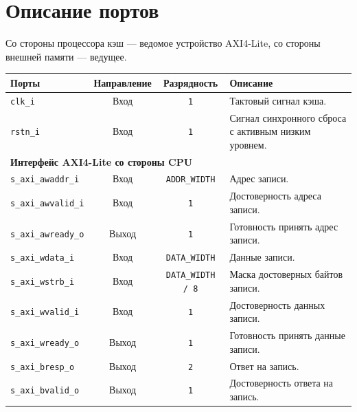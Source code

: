 \section{Описание портов}

Со стороны процессора кэш --- ведомое устройство AXI4-Lite, со стороны внешней памяти --- ведущее.

\begin{table}[H]
	\centering
	\label{tab:cache_ports}
	\small
	\begin{tabularx}{\textwidth}{l c c X}
		\toprule
		\textbf{Порты} & \textbf{Направление} & \textbf{Разрядность} & \textbf{Описание} \\
		\midrule
		
		\verb|clk_i| &
		Вход &
		\verb|1| &
		Тактовый сигнал кэша. \\
		
		\verb|rstn_i| &
		Вход &
		\verb|1| &
		Сигнал синхронного сброса с активным низким уровнем. \\
		
		\midrule
		\multicolumn{4}{l}{\textbf{Интерфейс AXI4-Lite со стороны CPU}} \\
		\midrule
		
		\verb|s_axi_awaddr_i| &
		Вход &
		\verb|ADDR_WIDTH| &
		Адрес записи. \\
		
		\verb|s_axi_awvalid_i| &
		Вход &
		\verb|1| &
		Достоверность адреса записи. \\
		
		\verb|s_axi_awready_o| &
		Выход &
		\verb|1| &
		Готовность принять адрес записи. \\
		
		\verb|s_axi_wdata_i| &
		Вход &
		\verb|DATA_WIDTH| &
		Данные записи. \\
		
		\verb|s_axi_wstrb_i| &
		Вход &
		\verb|DATA_WIDTH / 8| &
		Маска достоверных байтов записи. \\
		
		\verb|s_axi_wvalid_i| &
		Вход &
		\verb|1| &
		Достоверность данных записи. \\
		
		\verb|s_axi_wready_o| &
		Выход &
		\verb|1| &
		Готовность принять данные записи. \\
		
		\verb|s_axi_bresp_o| &
		Выход &
		\verb|2| &
		Ответ на запись. \\
		
		\verb|s_axi_bvalid_o| &
		Выход &
		\verb|1| &
		Достоверность ответа на запись. \\
		

\end{tabularx}
\end{table}
